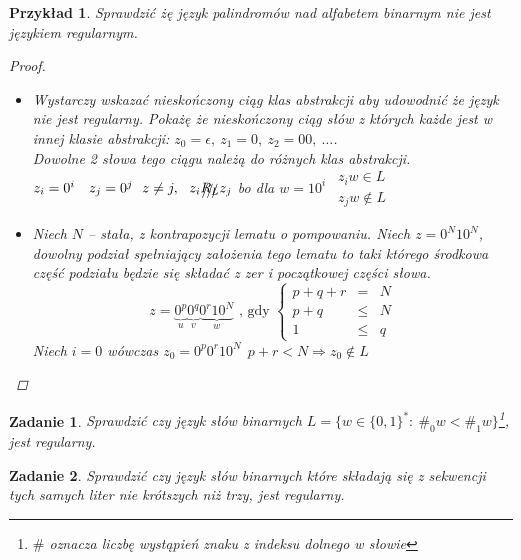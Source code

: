 \documentclass[12pt,a4paper]{article}
\newtheorem{przyklad}{Przykład}
\newtheorem{zad}{Zadanie}
\theoremstyle{definition}
\theoremstyle{remark}
\begin{document}
	\begin{przyklad}
		Sprawdzić żę język palindromów nad alfabetem binarnym nie jest językiem regularnym.
		\begin{proof}
			\begin{itemize}
				\item[sposób 1] Wystarczy wskazać nieskończony ciąg klas abstrakcji aby udowodnić że język nie jest regularny.
				Pokażę że nieskończony ciąg słów z których każde jest w innej klasie abstrakcji: 
				$z_0 = \epsilon, ~ z_1 = 0, ~ z_2 = 00, ~\dots$.\\
				Dowolne 2 słowa tego ciągu należą do różnych klas abstrakcji.
				$z_i = 0^i \quad z_j = 0^j ~~ z \neq j, ~~ z_i  \xout{R_L}z_j$ bo dla $w = 10^i ~~
				\begin{matrix}
					z_iw \in L \\ z_jw \not\in L
				\end{matrix}$
				\item[sposób 2] Niech $N$ -- stała, z kontrapozycji lematu o pompowaniu. Niech $z = 0^N10^N$, dowolny podział
				spełniający założenia tego lematu to taki którego środkowa część podziału będzie się składać
				z zer i początkowej części słowa.
				$$z = \underbrace{0^p}_u\underbrace{0^q}_v\underbrace{0^r10^N}_w\text{ , gdy }
				\left\lbrace \begin{matrix}
					p+q+r &=& N \\ p + q &\leqslant& N \\ 1 &\leqslant& q
				\end{matrix} \right.$$
				 Niech $i=0$ wówczas $z_0 = 0^p0^r10^N ~~ p+r < N \Rightarrow z_0 \not\in L$
			\end{itemize}
		\end{proof}
	\end{przyklad}	
	
	\begin{zad}
		Sprawdzić czy język słów binarnych $L = \{ w\in \{0,1\}^*: ~ \#_0w < \#_1w\}$\footnote{$\#$ oznacza liczbę wystąpień znaku z 
		indeksu dolnego w słowie}, jest regularny.
	\end{zad}
	\begin{zad}
		Sprawdzić czy język słów binarnych które składają się z sekwencji tych samych liter nie krótszych niż trzy, jest regularny.
	\end{zad}
	
\end{document}
